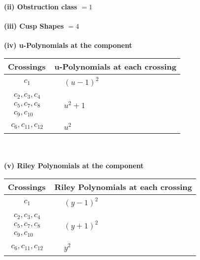 \documentclass[1p]{elsarticle_modified}
\theoremstyle{definition}
\begin{document}
\flushleft \textbf{(ii) Obstruction class $= 1$}\\~\\
\flushleft \textbf{(iii) Cusp Shapes $= 4$}\\~\\
\newpage\renewcommand{\arraystretch}{1}
\flushleft \textbf{(iv) u-Polynomials at the component}\newline \\
\begin{tabular}{m{50pt}|m{274pt}}
Crossings & \hspace{64pt}u-Polynomials at each crossing \\
\hline $$\begin{aligned}c_{1}\end{aligned}$$&$\begin{aligned}
&(u-1)^2
\end{aligned}$\\
\hline $$\begin{aligned}c_{2},c_{3},c_{4}\\c_{5},c_{7},c_{8}\\c_{9},c_{10}\end{aligned}$$&$\begin{aligned}
&u^2+1
\end{aligned}$\\
\hline $$\begin{aligned}c_{6},c_{11},c_{12}\end{aligned}$$&$\begin{aligned}
&u^2
\end{aligned}$\\
\hline
\end{tabular}\\~\\
\newpage\renewcommand{\arraystretch}{1}
\flushleft \textbf{(v) Riley Polynomials at the component}\newline \\
\begin{tabular}{m{50pt}|m{274pt}}
Crossings & \hspace{64pt}Riley Polynomials at each crossing \\
\hline $$\begin{aligned}c_{1}\end{aligned}$$&$\begin{aligned}
&(y-1)^2
\end{aligned}$\\
\hline $$\begin{aligned}c_{2},c_{3},c_{4}\\c_{5},c_{7},c_{8}\\c_{9},c_{10}\end{aligned}$$&$\begin{aligned}
&(y+1)^2
\end{aligned}$\\
\hline $$\begin{aligned}c_{6},c_{11},c_{12}\end{aligned}$$&$\begin{aligned}
&y^2
\end{aligned}$\\
\hline
\end{tabular}\\~\\
\end{document}
